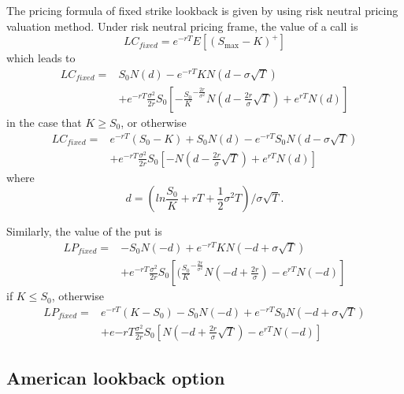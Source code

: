 \documentclass[11pt]{book}
\begin{document}
The pricing formula of fixed strike lookback is given by \cite{Conze1991} using risk neutral pricing valuation method. Under risk neutral pricing frame, the value of a call is 
\begin{equation}
LC_{fixed} = e^{-rT}E[(S_{\max}-K)^{+}]
\end{equation}
which leads to 
\begin{equation}
\begin{split}
LC_{fixed} =& S_0 N(d) - e^{-rT}KN(d-\sigma \sqrt{T}) \\
&+ e^{-rT} \frac{\sigma^2}{2r} S_0 [ -{\frac{S_0}{K}}^{-\frac{2r}{\sigma^2}} N(d-\frac{2r}{\sigma}\sqrt{T}) + e^{rT}N(d)] 
\end{split}
\end{equation}
in the case that $K\geq S_0$, or otherwise
\begin{equation}
\begin{split}
LC_{fixed} = & e^{-rT}(S_0 - K) + S_0 N(d) - e^{-rT}S_0 N(d-\sigma \sqrt{T}) \\
&+ e^{-rT} \frac{\sigma ^2}{2r} S_0 [ -N(d-\frac{2r}{\sigma}\sqrt{T}) + e^{rT}N(d)]
\end{split}
\end{equation}
where
\begin{equation}
d = ( ln\frac{S_0}{K} + rT + \frac{1}{2} \sigma^2 T)/ {\sigma \sqrt{T}}.
\end{equation}

Similarly, the value of the put is 
\begin{equation}
\begin{split}
LP_{fixed} =& -S_0 N(-d) + e^{-rT} KN(-d + \sigma \sqrt{T})  \\
&+ e^{-rT} \frac{\sigma^2}{2r} S_0 [ (\frac{S_0}{K}^{-\frac{2r}{\sigma^2}}N(-d+\frac{2r}{\sigma}) - e^{rT}N(-d)]
\end{split}
\end{equation}
if $K\leq S_0$, otherwise
\begin{equation}
\begin{split}
LP_{fixed} = & e^{-rT} (K-S_0) - S_0 N(-d) + e^{-rT}S_0 N (-d + \sigma \sqrt{T}) \\
&+ e{-rT} \frac{\sigma^2}{2r} S_0 [ N(-d + \frac{2r}{\sigma} \sqrt{T}) -e^{rT}N(-d)]
\end{split}
\end{equation}
 
\subsection{American lookback option}
\end{document}
